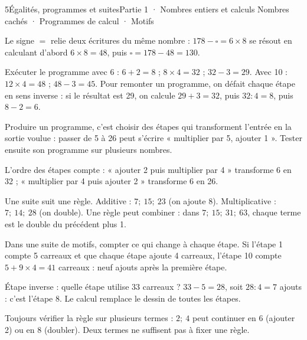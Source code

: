 \begin{ouverture}[algorithmique]{5}{Égalités, programmes et suites}{Partie 1 · Nombres entiers et calculs}
{Nombres cachés · Programmes de calcul · Motifs}
\end{ouverture}
\pagestyle{otMain}\essentiel\fontsize{11}{15}\selectfont
{}\label{cours-5-1}
\begin{definition}Le signe $=$ relie deux écritures du même nombre : $178-\square=6\times8$ se résout en calculant d’abord $6\times8=48$, puis $\square=178-48=130$.\end{definition}
\label{fig-cours-5-1-prog-cours}

\begin{exemple}Exécuter le programme avec 6 : $6+2=8$ ; $8\times4=32$ ; $32-3=29$. Avec 10 : $12\times4=48$ ; $48-3=45$. Pour remonter un programme, on défait chaque étape en sens inverse : si le résultat est 29, on calcule $29+3=32$, puis $32:4=8$, puis $8-2=6$.\end{exemple}
\begin{savoirfaire}Produire un programme, c’est choisir des étapes qui transforment l’entrée en la sortie voulue : passer de 5 à 26 peut s’écrire « multiplier par 5, ajouter 1 ». Tester ensuite son programme sur plusieurs nombres.\end{savoirfaire}
\begin{attention}L’ordre des étapes compte : « ajouter 2 puis multiplier par 4 » transforme 6 en 32 ; « multiplier par 4 puis ajouter 2 » transforme 6 en 26.\end{attention}
\clearpage
{}\label{cours-5-2}
\begin{propriete}Une suite suit une règle. Additive : $7 ;\ 15 ;\ 23$ (on ajoute 8). Multiplicative : $7 ;\ 14 ;\ 28$ (on double). Une règle peut combiner : dans $7 ;\ 15 ;\ 31 ;\ 63$, chaque terme est le double du précédent plus 1.\end{propriete}
\begin{savoirfaire}Dans une suite de motifs, compter ce qui change à chaque étape. Si l’étape 1 compte 5 carreaux et que chaque étape ajoute 4 carreaux, l’étape 10 compte $5+9\times4=41$ carreaux : neuf ajouts après la première étape.\end{savoirfaire}
\begin{exemple}Étape inverse : quelle étape utilise 33 carreaux ? $33-5=28$, soit $28:4=7$ ajouts : c’est l’étape 8. Le calcul remplace le dessin de toutes les étapes.\end{exemple}
\begin{attention}Toujours vérifier la règle sur plusieurs termes : $2 ;\ 4$ peut continuer en $6$ (ajouter 2) ou en $8$ (doubler). Deux termes ne suffisent pas à fixer une règle.\end{attention}

